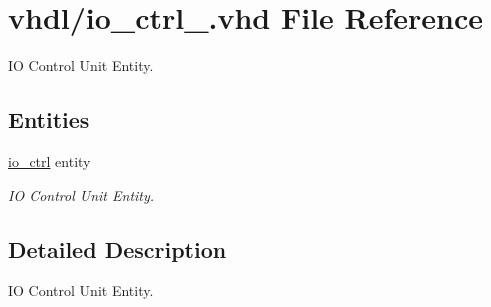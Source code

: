 \hypertarget{io__ctrl___8vhd}{}\section{vhdl/io\+\_\+ctrl\+\_\+.vhd File Reference}
\label{io__ctrl___8vhd}


IO Control Unit Entity.  


\subsection*{Entities}
\begin{DoxyCompactItemize}
\item 
\hyperlink{classio__ctrl}{io\+\_\+ctrl} entity
\begin{DoxyCompactList}\small\item\em IO Control Unit Entity. \end{DoxyCompactList}\end{DoxyCompactItemize}


\subsection{Detailed Description}
IO Control Unit Entity. 

